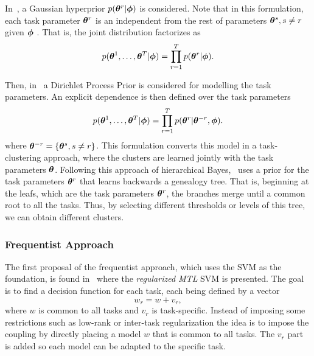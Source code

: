 In~\cite{YuTS05}, a Gaussian hyperprior $p(\bm{\theta}^r | \bm{\phi})$ is considered. Note that in this formulation, each task parameter $\bm{\theta}^r$ is an independent from the rest of parameters $\bm{\theta}^s, s \neq r$ given $\bm{\phi}$ .
That is, the joint distribution factorizes as
\begin{equation}
    \nonumber
    p(\bm{\theta}^1, \ldots, \bm{\theta}^T | \bm{\phi}) = \prod_{r=1}^T p(\bm{\theta}^r | \bm{\phi}) .
\end{equation} 

%
Then, in~\cite{XueLCK07} a Dirichlet Process Prior is considered for modelling the task parameters. An explicit dependence is then defined over the task parameters
\begin{equation}
    \nonumber
    p(\bm{\theta}^1, \ldots, \bm{\theta}^T | \bm{\phi}) = \prod_{r=1}^T p(\bm{\theta}^r |\bm{\theta}^{-r} , \bm{\phi}) .
\end{equation} 
where $\bm{\theta}^{-r}  = \left\{\bm{\theta}^s, s \neq r \right\}$.
This formulation converts this model in a task-clustering approach, where the clusters are learned jointly with the task parameters $\bm{\theta}$.
Following this approach of hierarchical Bayes,~\cite{Daume09} uses a prior for the task parameters $\bm{\theta}^r$ that learns backwards a genealogy tree. That is, beginning at the leafs, which are the task parameters $\bm{\theta}^r$, the branches merge until a common root to all the tasks. Thus, by selecting different thresholds or levels of this tree, we can obtain different clusters.

\subsubsection*{Frequentist Approach}
The first proposal of the frequentist approach, which uses the SVM as the foundation, is found in~\cite{EvgeniouP04} where the \emph{regularized MTL} SVM is presented. The goal is to find a decision function for each task, each being defined by a vector
$$w_r = w + v_r,$$
where $w$ is common to all tasks and $v_r$ is task-specific.
Instead of imposing some restrictions such as low-rank or inter-task regularization the idea is to impose the coupling by directly placing a model $w$ that is common to all tasks. The $v_r$ part is added so each model can be adapted to the specific task.
%

